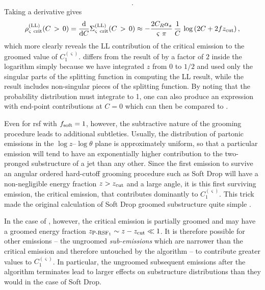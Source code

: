 \begin{example}
\begin{equation}
\begin{aligned}
        .
        \label{eq:convolDistExpansion}
    \end{aligned}
    \end{equation}
    Taking a derivative gives
    \begin{equation}
        \rho^{\rm(LL)}_{\varsigma~{\rm crit}} (C \,>\, 0)
        =
        \frac{\dd}{\dd C}\Sigma^{\rm(LL)}_{\varsigma~{\rm crit}} (C \,>\, 0)
        \approx
        -\frac{2 C_R \alpha_s} {\varsigma~\pi}\,\frac{1}{C}\,\log\left(2C + 2f \zcut\right)
        \label{eq:ll_pdf_expansion}
        ,
    \end{equation}
    which more clearly reveals the LL contribution of the critical emission to the groomed value of \(C_1^{(\varsigma)}\).
     differs from the  result of  by a factor of \(2\) inside the logarithm simply because we have integrated \(z\) from \(0\) to \(1/2\) and used only the singular parts of the splitting function in computing the LL result, while the  result includes non-singular pieces of the splitting function.
    By noting that the probability distribution must integrate to 1, one can also produce an expression with end-point contributions at \(C = 0\) which can then be compared to .
\end{example}

Even for \gls{rsf} with \(f_{\rm soft} = 1\), however, the subtractive nature of the grooming procedure leads to additional subtleties.
%
Usually, the distribution of partonic emissions in the \(\log z\)--\(\log \theta \) plane is approximately uniform, so that a particular emission will tend to have an exponentially higher contribution to the two-pronged substructure of a jet than any other.
%
Since the first emission to survive an angular ordered hard-cutoff grooming procedure such as Soft Drop will have a non-negligible energy fraction \(z > z_{\rm cut}\) and a large angle, it is this first surviving emission, the critical emission, that contributes dominantly to \(C_1^{(\varsigma)}\).
%
This trick made the original calculation of Soft Drop groomed substructure quite simple \cite{Larkoski:2014wba}.

In the case of , however, the critical emission is partially groomed and may have a groomed energy fraction \(z_{\text{P-RSF}_1} \sim z - z_{\rm cut} \ll 1\).
%
It is therefore possible for other emissions -- the ungroomed \textit{\glspl{sub-emission}} which are narrower than the critical emission and therefore untouched by the  algorithm -- to contribute greater values to \(C_1^{(\varsigma)}\).
%
In particular, the ungroomed subsequent emissions after the  algorithm terminates lead to larger effects on substructure distributions than they would in the case of Soft Drop.

